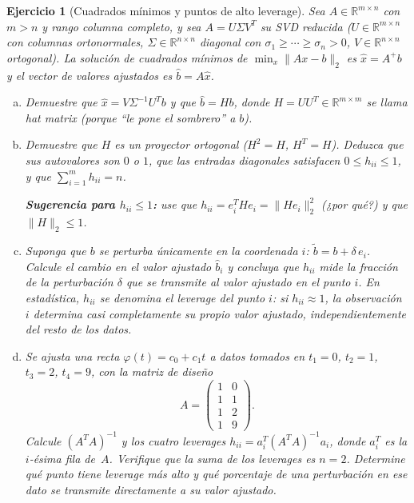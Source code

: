 \documentclass[12pt]{article}
\newtheorem{exercise}{Ejercicio}
\begin{document}

\begin{exercise}[Cuadrados mínimos y puntos de alto leverage]
Sea $A \in \mathbb{R}^{m \times n}$ con $m > n$ y rango columna completo, y sea $A = U\Sigma V^T$ su SVD reducida ($U \in \mathbb{R}^{m \times n}$ con columnas ortonormales, $\Sigma \in \mathbb{R}^{n \times n}$ diagonal con $\sigma_1 \geq \cdots \geq \sigma_n > 0$, $V \in \mathbb{R}^{n \times n}$ ortogonal). La solución de cuadrados mínimos de $\min_x \|Ax - b\|_2$ es $\hat{x} = A^+ b$ y el vector de valores ajustados es $\hat{b} = A\hat{x}$.

\begin{enumerate}[(a)]
\item Demuestre que $\hat{x} = V\Sigma^{-1}U^T b$ y que $\hat{b} = Hb$, donde $H = UU^T \in \mathbb{R}^{m \times m}$ se llama \emph{hat matrix} (porque ``le pone el sombrero'' a $b$).

\item Demuestre que $H$ es un proyector ortogonal ($H^2 = H$, $H^T = H$). Deduzca que sus autovalores son $0$ o $1$, que las entradas diagonales satisfacen $0 \leq h_{ii} \leq 1$, y que $\sum_{i=1}^m h_{ii} = n$.

\textbf{Sugerencia para $h_{ii} \leq 1$:} use que $h_{ii} = e_i^T H e_i = \|He_i\|_2^2$ (¿por qué?) y que $\|H\|_2 \leq 1$.

\item Suponga que $b$ se perturba únicamente en la coordenada $i$: $\tilde{b} = b + \delta\, e_i$. Calcule el cambio en el valor ajustado $\hat{b}_i$ y concluya que $h_{ii}$ mide la fracción de la perturbación $\delta$ que se transmite al valor ajustado en el punto $i$.
En estadística, $h_{ii}$ se denomina el \emph{leverage} del punto $i$: si $h_{ii} \approx 1$, la observación $i$ determina casi completamente su propio valor ajustado, independientemente del resto de los datos.

\item Se ajusta una recta $\varphi(t) = c_0 + c_1 t$ a datos tomados en $t_1 = 0$, $t_2 = 1$, $t_3 = 2$, $t_4 = 9$, con la matriz de diseño
\[
A = \begin{pmatrix} 1 & 0 \\ 1 & 1 \\ 1 & 2 \\ 1 & 9 \end{pmatrix}.
\]
Calcule $(A^TA)^{-1}$ y los cuatro leverages $h_{ii} = a_i^T(A^TA)^{-1}a_i$, donde $a_i^T$ es la $i$-ésima fila de~$A$. Verifique que la suma de los leverages es $n = 2$. Determine qué punto tiene leverage más alto y qué porcentaje de una perturbación en ese dato se transmite directamente a su valor ajustado.
\end{enumerate}
\end{exercise}
\end{document}
